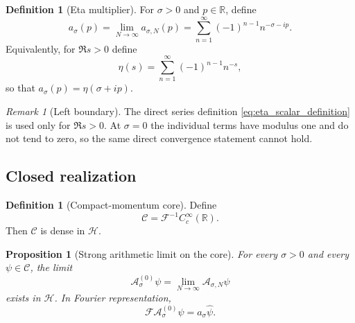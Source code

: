 \documentclass[11pt]{amsart}
\numberwithin{equation}{section}
\theoremstyle{plain}
\newtheorem{proposition}[theorem]{Proposition}
\theoremstyle{definition}
\newtheorem{definition}[theorem]{Definition}
\theoremstyle{remark}
\newtheorem{remark}[theorem]{Remark}
\newcommand{\R}{\mathbb{R}}
\newcommand{\Hil}{\mathcal{H}}
\newcommand{\Four}{\mathcal{F}}
\begin{document}
\begin{definition}[Eta multiplier]
\label{def:eta_multiplier}
For $\sigma>0$ and $p\in\R$, define
\begin{equation}
a_\sigma(p)
=\lim_{N\to\infty}a_{\sigma,N}(p)
=\sum_{n=1}^{\infty}(-1)^{n-1}n^{-\sigma-ip}.
\label{eq:eta_multiplier}
\end{equation}
Equivalently, for $\Re s>0$ define
\begin{equation}
\eta(s)=\sum_{n=1}^{\infty}(-1)^{n-1}n^{-s},
\label{eq:eta_scalar_definition}
\end{equation}
so that $a_\sigma(p)=\eta(\sigma+ip)$.
\end{definition}

\begin{remark}[Left boundary]
\label{rem:eta_left_boundary}
The direct series definition \eqref{eq:eta_scalar_definition} is used only
for $\Re s>0$.  At $\sigma=0$ the individual terms have modulus one and do
not tend to zero, so the same direct convergence statement cannot hold.
\end{remark}

\subsection{Closed realization}
\label{subsec:eta_closed_realization}

\begin{definition}[Compact-momentum core]
\label{def:compact_momentum_core}
Define
\begin{equation}
\mathcal C
=\Four^{-1}C_c^\infty(\R).
\label{eq:compact_momentum_core}
\end{equation}
Then $\mathcal C$ is dense in $\Hil$.
\end{definition}

\begin{proposition}[Strong arithmetic limit on the core]
\label{prop:eta_strong_core_limit}
For every $\sigma>0$ and every $\psi\in\mathcal C$, the limit
\begin{equation}
\mathcal A_\sigma^{(0)}\psi
=\lim_{N\to\infty}\mathcal A_{\sigma,N}\psi
\label{eq:eta_core_limit}
\end{equation}
exists in $\Hil$.  In Fourier representation,
\begin{equation}
\Four\mathcal A_\sigma^{(0)}\psi
=a_\sigma\widehat\psi.
\label{eq:eta_core_multiplier_action}
\end{equation}
\end{proposition}
\end{document}

